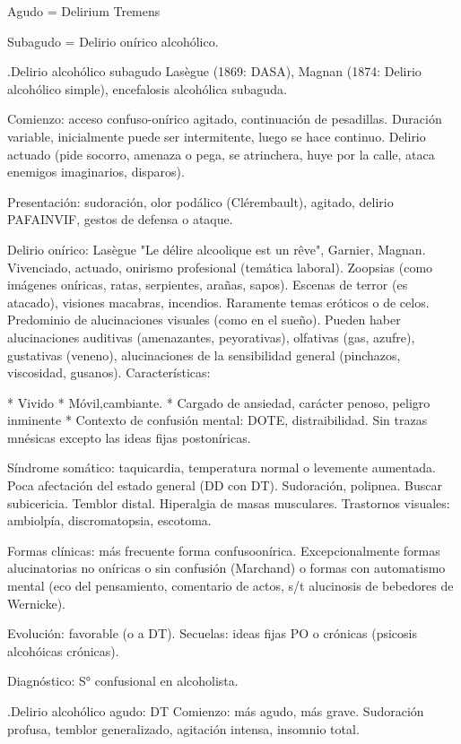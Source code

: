\documentclass{scrbook}
\begin{document}
Agudo = Delirium Tremens

Subagudo = Delirio onírico alcohólico.

.Delirio alcohólico subagudo
Lasègue (1869: DASA), Magnan (1874: Delirio alcohólico simple), encefalosis alcohólica subaguda.

Comienzo: acceso confuso-onírico agitado, continuación de pesadillas. Duración variable, inicialmente puede ser intermitente, luego se hace continuo. Delirio actuado (pide socorro, amenaza o pega, se atrinchera, huye por la calle, ataca enemigos imaginarios, disparos).

Presentación: sudoración, olor podálico (Clérembault), agitado, delirio PAFAINVIF, gestos de defensa o ataque.

Delirio onírico: Lasègue "Le délire alcoolique est un rêve", Garnier, Magnan. Vivenciado, actuado, onirismo profesional (temática laboral). Zoopsias (como imágenes oníricas, ratas, serpientes, arañas, sapos). Escenas de terror (es atacado), visiones macabras, incendios. Raramente temas eróticos o de celos. Predominio de alucinaciones visuales (como en el sueño). Pueden haber alucinaciones auditivas (amenazantes, peyorativas), olfativas (gas, azufre), gustativas (veneno), alucinaciones de la sensibilidad general (pinchazos, viscosidad, gusanos). Características:

* Vivido
* Móvil,cambiante.
* Cargado de ansiedad, carácter penoso, peligro inminente
* Contexto de confusión mental: DOTE, distraibilidad. Sin trazas mnésicas excepto las ideas fijas postoníricas.

Síndrome somático: taquicardia, temperatura normal o levemente aumentada. Poca afectación del estado general (DD con DT). Sudoración, polipnea. Buscar subicericia. Temblor distal. Hiperalgia de masas musculares. Trastornos visuales: ambiolpía, discromatopsia, escotoma.

Formas clínicas: más frecuente forma confusoonírica. Excepcionalmente formas alucinatorias no oníricas o sin confusión (Marchand) o formas con automatismo mental (eco del pensamiento, comentario de actos, s/t alucinosis de bebedores de Wernicke).

Evolución: favorable (o a DT). Secuelas: ideas fijas PO o crónicas (psicosis alcohóicas crónicas).

Diagnóstico: S° confusional en alcoholista.

.Delirio alcohólico agudo: DT
Comienzo: más agudo, más grave. Sudoración profusa, temblor generalizado, agitación intensa, insomnio total.
\end{document}
